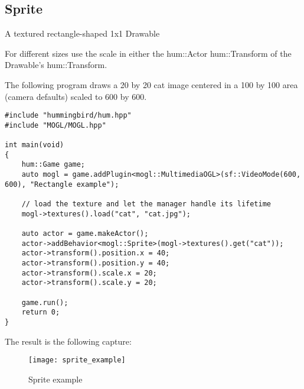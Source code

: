 \subsection{Sprite}
A textured rectangle-shaped 1x1 Drawable

For different sizes use the scale in either the hum::Actor hum::Transform of
the Drawable's hum::Transform.

The following program draws a 20 by 20 cat image centered in a 100 by 100 area (camera 
defaults) scaled to 600 by 600.
\begin{lstlisting}[caption=Rectangle example]
#include "hummingbird/hum.hpp"
#include "MOGL/MOGL.hpp"

int main(void)
{
    hum::Game game;
    auto mogl = game.addPlugin<mogl::MultimediaOGL>(sf::VideoMode(600, 600), "Rectangle example");

    // load the texture and let the manager handle its lifetime
    mogl->textures().load("cat", "cat.jpg");

    auto actor = game.makeActor();
    actor->addBehavior<mogl::Sprite>(mogl->textures().get("cat"));
    actor->transform().position.x = 40;
    actor->transform().position.y = 40;
    actor->transform().scale.x = 20;
    actor->transform().scale.y = 20;

    game.run();
    return 0;
}
\end{lstlisting}

The result is the following capture:

\begin{figure}[H]
    \centering
    \texttt{[image: sprite\_example]}
    \caption{Sprite example}
    \label{fig:sprite_example}
\end{figure}
